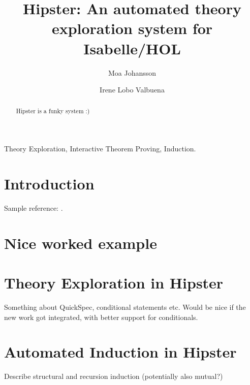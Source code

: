 \documentclass{elsarticle}
\begin{document}
\begin{frontmatter}

\title{Hipster: An automated theory exploration system for Isabelle/HOL}

\author{Moa Johansson} 

\author{Irene Lobo Valbuena}
\address{Chalmers University of Technology, Gothenburg, Sweden.}





\begin{abstract}
Hipster is a funky system :)
\end{abstract}

\begin{keyword}
Theory Exploration, Interactive Theorem Proving, Induction.
\end{keyword}

\end{frontmatter}

\linenumbers

\section{Introduction}
Sample reference: \cite{hipspecCADE}.

\section{Nice worked example}

\section{Theory Exploration in Hipster} 
Something about QuickSpec, conditional statements etc.
Would be nice if the new work got integrated, with better support for conditionals.

\section{Automated Induction in Hipster}
Describe structural and recursion induction (potentially also mutual?)
\end{document}
